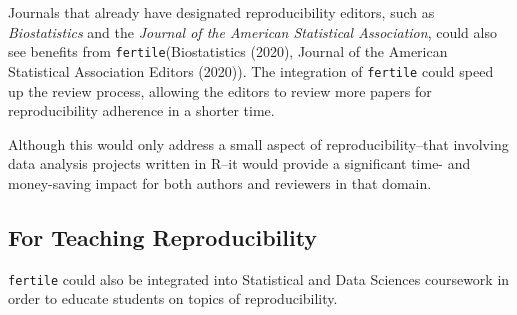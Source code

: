 \documentclass[12pt,twoside]{reedthesis}
\begin{document}
Journals that already have designated reproducibility editors, such as
\emph{Biostatistics} and the \emph{Journal of the American Statistical
Association}, could also see benefits from
\texttt{fertile}(Biostatistics (2020), Journal of the American
Statistical Association Editors (2020)). The integration of
\texttt{fertile} could speed up the review process, allowing the editors
to review more papers for reproducibility adherence in a shorter time.

Although this would only address a small aspect of reproducibility--that
involving data analysis projects written in R--it would provide a
significant time- and money-saving impact for both authors and reviewers
in that domain.

\subsection{For Teaching
Reproducibility}\label{for-teaching-reproducibility}

\texttt{fertile} could also be integrated into Statistical and Data
Sciences coursework in order to educate students on topics of
reproducibility.
\end{document}
